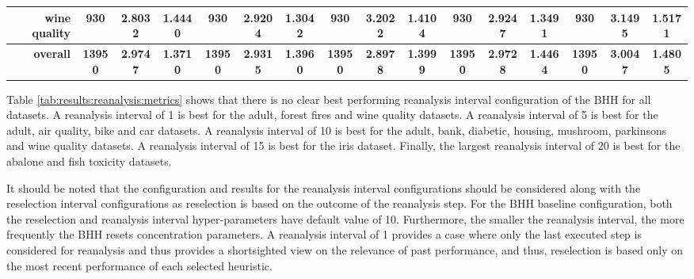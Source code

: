 \begin{table}[H]
{\begin{tabular}{rccccccccccccccc}
			wine quality                        & 930                                     & \cellcolor[rgb]{ .776,  .937,  .808}\textcolor[rgb]{ 0,  .38,  0}{2.8032} & 1.4440          & 930                            & 2.9204                                                                    & 1.3042          & 930                             & 3.2022                                                                             & 1.4104          & 930                             & 2.9247                                                                    & 1.3491          & 930                             & 3.1495                                                                    & 1.5171          \\
			\midrule
			\textbf{overall}                    & \textbf{13950}                          & \textbf{2.9747}                                                           & \textbf{1.3710} & \textbf{13950}                 & \textbf{2.9315}                                                           & \textbf{1.3960} & \textbf{13950}                  & \cellcolor[rgb]{ .776,  .937,  .808}\textcolor[rgb]{ 0,  .38,  0}{\textbf{2.8978}} & \textbf{1.3999} & \textbf{13950}                  & \textbf{2.9728}                                                           & \textbf{1.4464} & \textbf{13950}                  & \textbf{3.0047}                                                           & \textbf{1.4805} \\
		\end{tabular}%
	}

\end{table}%

Table \ref{tab:results:reanalysis:metrics} shows that there is no clear best performing reanalysis interval configuration of the \acs{BHH} for all datasets. A reanalysis interval of 1 is best for the adult, forest fires and wine quality datasets. A reanalysis interval of 5 is best for the adult, air quality, bike and car datasets. A reanalysis interval of 10 is best for the adult, bank, diabetic, housing, mushroom, parkinsons and wine quality datasets. A reanalysis interval of 15 is best for the iris dataset. Finally, the largest reanalysis interval of 20 is best for the abalone and fish toxicity datasets.

It should be noted that the configuration and results for the reanalysis interval configurations should be considered along with the reselection interval configurations as reselection is based on the outcome of the reanalysis step. For the \acs{BHH} baseline configuration, both the reselection and reanalysis interval hyper-parameters have default value of 10. Furthermore, the smaller the reanalysis interval, the more frequently the \acs{BHH} resets concentration parameters. A reanalysis interval of 1 provides a case where only the last executed step is considered for reanalysis and thus provides a shortsighted view on the relevance of past performance, and thus, reselection is based only on the most recent performance of each selected heuristic.

